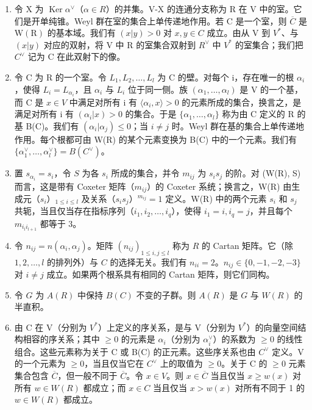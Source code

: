 \begin{enumerate}
\def\labelenumi{\arabic{enumi})}
\setcounter{enumi}{8}
\item
  令 X 为 \(\operatorname{Ker}\alpha^{\vee}\)（\(\alpha\in R\)）的并集。V-X 的连通分支称为 R 在 V 中的室。它们是开单纯锥。Weyl 群在室的集合上单传递地作用。若 C 是一个室，则 \(\overline{C}\) 是 \(\mathrm{W}(\mathrm{R})\) 的基本域。我们有 \((x|y)>0\) 对 \(x,y\in C\) 成立。由从 V 到 \(V^{*}\)、与 \((x|y)\) 对应的双射，将 V 中 R 的室集合双射到 \(R^{\vee}\) 中 \(V^{*}\) 的室集合；我们把 \(C^{\vee}\) 记为 C 在此双射下的像。
\item
  令 C 为 R 的一个室。令 \(L_{1}, L_{2}, \ldots, L_{l}\) 为 C 的壁。对每个 i，存在唯一的根 \(\alpha_{i}\)，使得 \(L_{i} = L_{\alpha_{i}}\)，且 \(\alpha_{i}\) 与 \(L_{i}\) 位于同一侧。族 \((\alpha_{1}, \ldots, \alpha_{l})\) 是 V 的一个基，而 C 是 \(x \in V\) 中满足对所有 i 有 \(\langle \alpha_{i}, x \rangle > 0\) 的元素所成的集合，换言之，是满足对所有 i 有 \((\alpha_{i} | x) > 0\) 的集合。于是 \(\{\alpha_{1}, \ldots, \alpha_{l}\}\) 称为由 C 定义的 R 的基 B(C)。我们有 \((\alpha_{i} | \alpha_{j}) \leqslant 0\)；当 \(i \neq j\) 时。Weyl 群在基的集合上单传递地作用。每个根都可由 W(R) 的某个元素变换为 B(C) 中的一个元素。我们有 \(\{\alpha_{1}^{\vee}, \ldots, \alpha_{l}^{\vee}\} = B(C^{\vee})\)。
\item
  置 \(s_{\alpha_i} = s_i\)，令 \(S\) 为各 \(s_i\) 所成的集合，并令 \(m_{ij}\) 为 \(s_i s_j\) 的阶。对 (W(R), S) 而言，这是带有 Coxeter 矩阵（\(m_{ij}\)）的 Coxeter 系统；换言之，W(R) 由生成元（\(s_i\)）\(_{1 \leqslant i \leqslant l}\) 及关系（\(s_i s_j\)）\(^{m_{ij}} = 1\) 定义。W(R) 中的两个元素 \(s_i\) 和 \(s_j\) 共轭，当且仅当存在指标序列（\(i_1, i_2, \ldots, i_q\)），使得 \(i_1 = i, i_q = j\)，并且每个 \(m_{i_l i_{l+1}}\) 都等于 3。
\item
  令 \(n_{ij} = n(\alpha_i, \alpha_j)\)。矩阵 \((n_{ij})_{1 \leqslant i,j \leqslant l}\) 称为 \(R\) 的 Cartan 矩阵。它（除 \(1, 2, \ldots, l\) 的排列外）与 \(C\) 的选择无关。我们有 \(n_{ii} = 2\)。\(n_{ij} \in \{0, -1, -2, -3\}\) 对 \(i \neq j\) 成立。如果两个根系具有相同的 Cartan 矩阵，则它们同构。
\item
  令 \(G\) 为 \(A(R)\) 中保持 \(B(C)\) 不变的子群。则 \(A(R)\) 是 \(G\) 与 \(W(R)\) 的半直积。
\item
  由 C 在 V（分别为 \(V^{*}\)）上定义的序关系，是与 V（分别为 \(V^{*}\)）的向量空间结构相容的序关系；其中 \(\geqslant 0\) 的元素是 \(\alpha_{i}\)（分别为 \(\alpha_{i}^{\vee}\)）的系数为 \(\geqslant 0\) 的线性组合。这些元素称为关于 C 或 B(C) 的正元素。这些序关系也由 \(C^{\vee}\) 定义。V 的一个元素为 \(\geqslant 0\)，当且仅当它在 \(C^{\vee}\) 上的取值为 \(\geqslant 0\)。关于 C 的 \(\geqslant 0\) 元素集合包含 \(\overline{C}\)，但一般不同于 \(\overline{C}\)。令 \(x \in V\)。则 \(x \in \overline{C}\) 当且仅当 \(x \geqslant w(x)\) 对所有 \(w \in W(R)\) 都成立；而 \(x \in C\) 当且仅当 \(x > w(x)\) 对所有不同于 1 的 \(w \in W(R)\) 都成立。

\end{enumerate}
